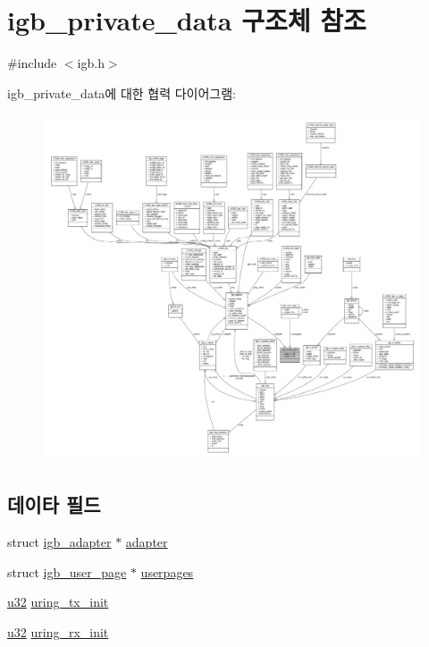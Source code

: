 \hypertarget{structigb__private__data}{}\section{igb\+\_\+private\+\_\+data 구조체 참조}
\label{structigb__private__data}


{\ttfamily \#include $<$igb.\+h$>$}



igb\+\_\+private\+\_\+data에 대한 협력 다이어그램\+:
\nopagebreak
\begin{figure}[H]
\begin{center}
\leavevmode
\includegraphics[width=350pt]{structigb__private__data__coll__graph}
\end{center}
\end{figure}
\subsection*{데이타 필드}
\begin{DoxyCompactItemize}
\item 
struct \hyperlink{structigb__adapter}{igb\+\_\+adapter} $\ast$ \hyperlink{structigb__private__data_a194d1b705839346098846e03d7ae3108}{adapter}
\item 
struct \hyperlink{structigb__user__page}{igb\+\_\+user\+\_\+page} $\ast$ \hyperlink{structigb__private__data_a4699ce469a0376905a64dfccc9999ff6}{userpages}
\item 
\hyperlink{lib_2igb_2e1000__osdep_8h_a64e91c10a0d8fb627e92932050284264}{u32} \hyperlink{structigb__private__data_ad5021b5f96ba57d48c8c6300cad743af}{uring\+\_\+tx\+\_\+init}
\item 
\hyperlink{lib_2igb_2e1000__osdep_8h_a64e91c10a0d8fb627e92932050284264}{u32} \hyperlink{structigb__private__data_ac9827ee428dd1c94a27b260995bb2525}{uring\+\_\+rx\+\_\+init}
\end{DoxyCompactItemize}


